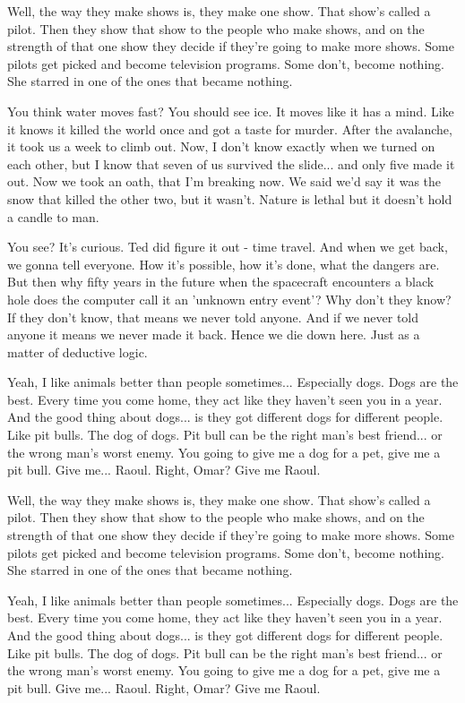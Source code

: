\documentclass{cs19proc}
\begin{document}
Well, the way they make shows is, they make one show. That show's called a pilot. Then they show that show to the people who make shows, and on the strength of that one show they decide if they're going to make more shows. Some pilots get picked and become television programs. Some don't, become nothing. She starred in one of the ones that became nothing.

You think water moves fast? You should see ice. It moves like it has a mind. Like it knows it killed the world once and got a taste for murder. After the avalanche, it took us a week to climb out. Now, I don't know exactly when we turned on each other, but I know that seven of us survived the slide... and only five made it out. Now we took an oath, that I'm breaking now. We said we'd say it was the snow that killed the other two, but it wasn't. Nature is lethal but it doesn't hold a candle to man.

You see? It's curious. Ted did figure it out - time travel. And when we get back, we gonna tell everyone. How it's possible, how it's done, what the dangers are. But then why fifty years in the future when the spacecraft encounters a black hole does the computer call it an 'unknown entry event'? Why don't they know? If they don't know, that means we never told anyone. And if we never told anyone it means we never made it back. Hence we die down here. Just as a matter of deductive logic.

Yeah, I like animals better than people sometimes... Especially dogs. Dogs are the best. Every time you come home, they act like they haven't seen you in a year. And the good thing about dogs... is they got different dogs for different people. Like pit bulls. The dog of dogs. Pit bull can be the right man's best friend... or the wrong man's worst enemy. You going to give me a dog for a pet, give me a pit bull. Give me... Raoul. Right, Omar? Give me Raoul.

Well, the way they make shows is, they make one show. That show's called a pilot. Then they show that show to the people who make shows, and on the strength of that one show they decide if they're going to make more shows. Some pilots get picked and become television programs. Some don't, become nothing. She starred in one of the ones that became nothing.

Yeah, I like animals better than people sometimes... Especially dogs. Dogs are the best. Every time you come home, they act like they haven't seen you in a year. And the good thing about dogs... is they got different dogs for different people. Like pit bulls. The dog of dogs. Pit bull can be the right man's best friend... or the wrong man's worst enemy. You going to give me a dog for a pet, give me a pit bull. Give me... Raoul. Right, Omar? Give me Raoul.
\end{document}
